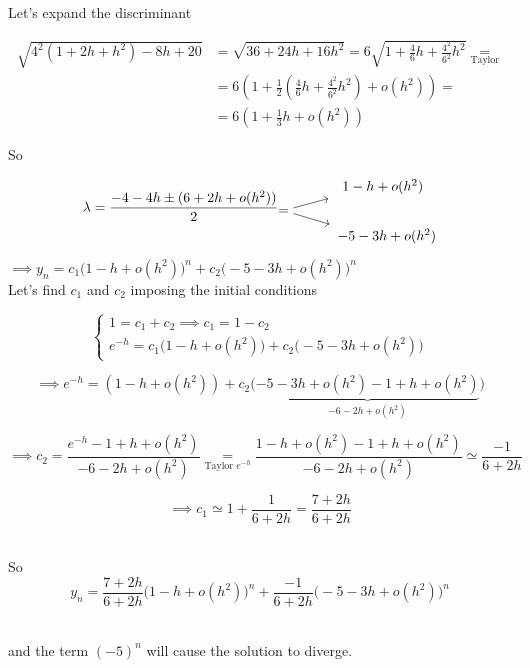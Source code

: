 \begin{example}
    Let's expand the discriminant
    
    \begin{align*}
        \sqrt{4^2(1 + 2h + h^2) - 8h + 20} &= \sqrt{36 + 24h +16h^2} = 6\sqrt{1+\frac{4}{6}h + \frac{4^2}{6^2}h^2} \underset{\text{Taylor}}{=}\\
        &=6\left(1 + \frac{1}{2}\left(\frac{4}{6}h + \frac{4^2}{6^2}h^2\right) + o(h^2)\right) =\\
        &=6\left(1 + \frac{1}{3}h + o(h^2)\right)
    \end{align*}
      
    So
    
    $$
        \lambda = \frac{-4 - 4h \pm (6 + 2h + o(h^2))}{2}
          \begin{tikzcd}[cramped, sep=tiny]
                                    & \hspace{0.6cm}1-h+o(h^2) \\
            = \arrow[ur] \arrow[dr] &            \\
                                    & \hspace{0.8cm}-5-3h + o(h^2)
          \end{tikzcd}
    $$
    
    $\implies y_n = c_1\big(1-h+o(h^2)\big)^n + c_2\big(-5-3h+o(h^2)\big)^n$\\
    
    \newpage
    Let's find $c_1$ and $c_2$ imposing the initial conditions
    
    \[
    \begin{cases}
        1=c_1+c_2 \implies c_1 = 1-c_2 \\
        e^{-h} = c_1\big(1-h+o(h^2)\big) + c_2\big(-5-3h+o(h^2)\big)
    \end{cases}
    \]
    
    \[
       \implies e^{-h} = (1-h+o(h^2)) + c_2\big(\underbrace{-5-3h+o(h^2) - 1 + h + o(h^2)}_{-6-2h+o(h^2)}\big)
    \]
    
    \[
      \implies c_2 = \frac{e^{-h} - 1 + h +o(h^2)}{-6-2h+o(h^2)} \underset{\text{Taylor }e^{-h}}{=} \frac{1-h+o(h^2) - 1 + h +o(h^2)}{-6-2h+o(h^2)} \simeq \frac{-1}{6+2h}
    \]
    
    \[
      \implies c_1 \simeq 1 + \frac{1}{6+2h} = \frac{7+2h}{6+2h}
    \]
    
    \-\\So $$y_n = \frac{7+2h}{6+2h}\big(1-h+o(h^2)\big)^n + \frac{-1}{6+2h}\big(-5-3h+o(h^2)\big)^n$$
    
    \-\\and the term $(-5)^n$ will cause the solution to diverge.
\end{example}